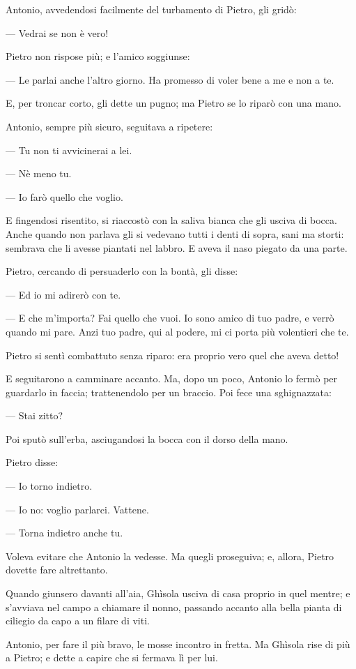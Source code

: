 Antonio, avvedendosi facilmente del turbamento di Pietro, gli gridò:

— Vedrai se non è vero!

Pietro non rispose più; e l’amico soggiunse:

— Le parlai anche l’altro giorno. Ha promesso di voler bene a me e non a te.

E, per troncar corto, gli dette un pugno; ma Pietro se lo riparò con una mano.

Antonio, sempre più sicuro, seguitava a ripetere:

— Tu non ti avvicinerai a lei.

— Nè meno tu.

— Io farò quello che voglio.

E fingendosi risentito, si riaccostò con la saliva bianca che gli usciva di bocca. Anche quando non parlava gli si vedevano tutti i denti di sopra, sani ma storti: sembrava che li avesse piantati nel labbro. E aveva il naso piegato da una parte.

Pietro, cercando di persuaderlo con la bontà, gli disse:

— Ed io mi adirerò con te.

— E che m'importa? Fai quello che vuoi. Io sono amico di tuo padre, e verrò quando mi pare. Anzi tuo padre, qui al podere, mi ci porta più volentieri che te.

Pietro si sentì combattuto senza riparo: era proprio vero quel che aveva detto!

E seguitarono a camminare accanto. Ma, dopo un poco, Antonio lo fermò per guardarlo in faccia; trattenendolo per un braccio. Poi fece una sghignazzata:

— Stai zitto?

Poi sputò sull'erba, asciugandosi la bocca con il dorso della mano.

Pietro disse:

— Io torno indietro.

— Io no: voglio parlarci. Vattene.

— Torna indietro anche tu.

Voleva evitare che Antonio la vedesse. Ma quegli proseguiva; e, allora, Pietro dovette fare altrettanto.

Quando giunsero davanti all'aia, Ghìsola usciva di casa proprio in quel mentre; e s'avviava nel campo a chiamare il nonno, passando accanto alla bella pianta di ciliegio da capo a un filare di viti.

Antonio, per fare il più bravo, le mosse incontro in fretta. Ma Ghìsola rise di più a Pietro; e dette a capire che si fermava lì per lui.

